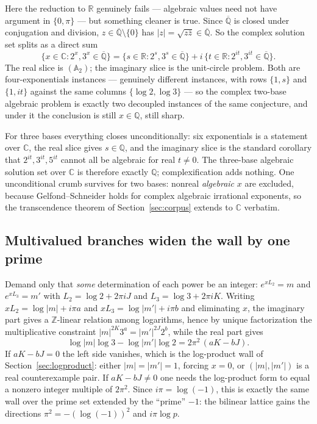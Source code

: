 \documentclass[11pt,oneside]{article}
\theoremstyle{definition}
\theoremstyle{remark}
\newcommand{\Z}{\mathbb Z}
\newcommand{\Q}{\mathbb Q}
\newcommand{\R}{\mathbb R}
\newcommand{\C}{\mathbb C}
\newcommand{\Abar}{\overline{\mathbb Q}}
\newcommand{\Qbar}{\Abar}
\begin{document}
Here the reduction to $\R$ genuinely fails --- algebraic values need not have argument in
$\{0,\pi\}$ --- but something cleaner is true.  Since $\Qbar$ is closed under conjugation and
division, $z\in\Qbar\setminus\{0\}$ has $|z|=\sqrt{z\bar z}\in\Qbar$.  So the complex solution
set splits as a direct sum
\[
  \{x\in\C:2^x,3^x\in\Qbar\}
  =\{s\in\R:2^s,3^s\in\Qbar\}+i\,\{t\in\R:2^{it},3^{it}\in\Qbar\} .
\]
The real slice is $(\mathbb A_2)$; the imaginary slice is the unit-circle problem.  Both are
four-exponentials instances --- genuinely different instances, with rows $\{1,s\}$ and
$\{1,it\}$ against the same columns $\{\log2,\log3\}$ --- so the complex two-base algebraic
problem is exactly two decoupled instances of the same conjecture, and under it the conclusion
is still $x\in\Q$, still sharp.

For three bases everything closes unconditionally: six exponentials is a statement over $\C$,
the real slice gives $s\in\Q$, and the imaginary slice is the standard corollary that
$2^{it},3^{it},5^{it}$ cannot all be algebraic for real $t\ne0$.  The three-base algebraic
solution set over $\C$ is therefore exactly $\Q$; complexification adds nothing.  One
unconditional crumb survives for two bases: nonreal \emph{algebraic} $x$ are excluded, because
Gelfond--Schneider holds for complex algebraic irrational exponents, so the transcendence
theorem of Section~\ref{sec:corpus} extends to $\C$ verbatim.

\subsection{Multivalued branches widen the wall by one prime}

Demand only that \emph{some} determination of each power be an integer:
$e^{xL_2}=m$ and $e^{xL_3}=m'$ with $L_2=\log2+2\pi iJ$ and $L_3=\log3+2\pi iK$.  Writing
$xL_2=\log|m|+i\pi a$ and $xL_3=\log|m'|+i\pi b$ and eliminating $x$, the imaginary part gives
a $\Z$-linear relation among logarithms, hence by unique factorization the multiplicative
constraint $|m|^{2K}3^a=|m'|^{2J}2^b$, while the real part gives
\begin{equation}
  \log|m|\log3-\log|m'|\log2=2\pi^2\,(aK-bJ).
  \label{eq:va-branch}
\end{equation}
If $aK-bJ=0$ the left side vanishes, which is the log-product wall of
Section~\ref{sec:logproduct}: either $|m|=|m'|=1$, forcing $x=0$, or $(|m|,|m'|)$ is a real
counterexample pair.  If $aK-bJ\ne0$ one needs the log-product form to equal a nonzero integer
multiple of $2\pi^2$.  Since $i\pi=\log(-1)$, this is exactly the same wall over the prime set
extended by the ``prime'' $-1$: the bilinear lattice gains the directions
$\pi^2=-(\log(-1))^2$ and $i\pi\log p$.
\end{document}
